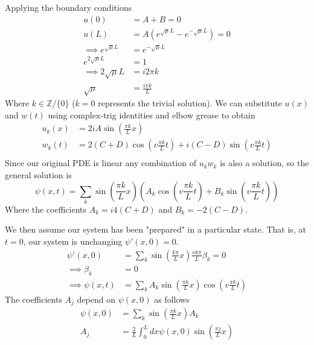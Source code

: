 Applying the boundary conditions
\begin{equation}
    \begin{split}
        u(0) & = A + B = 0\\
        u(L) & = A(e^{\sqrt{\mu}L}-e^{-\sqrt{\mu}L}) = 0\\
        \implies e^{\sqrt{\mu}L}&=e^{-\sqrt{\mu}L}\\
        e^{2\sqrt{\mu}L} &= 1\\
        \implies 2\sqrt{\mu}L &= i2\pi k\\
        \sqrt{\mu} &= \frac{i\pi k}{L}
    \end{split}
\end{equation}
Where $k \in \mathbb{Z}/\{0\}$ ($k=0$ represents the trivial solution). We can substitute $u(x)$ and $w(t)$ using complex-trig identities and elbow grease to obtain
\begin{equation}
    \begin{split}
        u_k(x) &= 2iA\sin(\frac{\pi k}{L}x)\\
        w_k(t) &= 2(C+D)\cos(v\frac{\pi k}{L}t)+i(C-D)\sin(v\frac{\pi k}{L}t)\\
    \end{split}
\end{equation}
Since our original PDE is linear any combination of $u_kw_k$ is also a solution, so the general solution is
\begin{equation}
    \psi(x,t) = \sum_k\sin(\frac{\pi k}{L}x)(A_k\cos(v\frac{\pi k}{L}t)+B_k\sin(v\frac{\pi k}{L}t))
\end{equation}
Where the coefficients $A_k = i4(C+D)$ and $B_k = -2(C-D)$.

We then assume our system has been "prepared" in a particular state. That is, at $t=0$, our system is unchanging $\psi'(x,0)=0$.
\begin{equation}
\begin{split}
        \psi'(x,0) &= \sum_k\sin(\frac{k\pi}{L}x)\frac{vk\pi}{L}\beta_k=0\\
        \implies \beta_k &= 0\\
        \implies \psi(x,t) &=  \sum_kA_k\sin(\frac{\pi k}{L}x)\cos(v\frac{\pi k}{L}t)
\end{split}
\end{equation}
The coefficients $A_j$ depend on $\psi(x,0)$ as follows
\begin{equation}
\begin{split}
    \psi(x,0) &= \sum_k\sin(\frac{\pi k}{L}x)A_k\\
    A_j &= \frac{2}{L}\int_0^Ldx\psi(x,0)\sin(\frac{\pi j}{L}x)
\end{split}
\end{equation}

